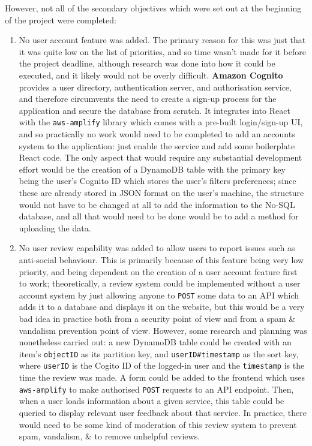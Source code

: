 \documentclass[a4paper,11pt]{report}
\begin{document}
However, not all of the secondary objectives which were set out at the beginning of the project were completed:
\begin{enumerate}
    \item   No user account feature was added.
            The primary reason for this was just that it was quite low on the list of priorities, and so time wasn't made for it before the project deadline, although research was done into how it could be executed, and it likely would not be overly difficult.
            \textbf{Amazon Cognito}\supercite{cognito} provides a user directory, authentication server, and authorisation service, and therefore circumvents the need to create a sign-up process for the application and secure the database from scratch.
            It integrates into React with the \texttt{aws-amplify} library\supercite{amplify} which comes with a pre-built login/sign-up UI, and so practically no work would need to be completed to add an accounts system to the application: just enable the service and add some boilerplate React code.
            The only aspect that would require any substantial development effort would be the creation of a DynamoDB table with the primary key being the user's Cognito ID which stores the user's filters preferences;
            since these are already stored in JSON format on the user's machine, the structure would not have to be changed at all to add the information to the No-SQL database, and all that would need to be done would be to add a method for uploading the data.

    \item   No user review capability was added to allow users to report issues such as anti-social behaviour.
            This is primarily because of this feature being very low priority, and being dependent on the creation of a user account feature first to work;
            theoretically, a review system could be implemented without a user account system by just allowing anyone to \verb|POST| some data to an API which adds it to a database and displays it on the website, but this would be a very bad idea in practice both from a security point of view and from a spam \& vandalism prevention point of view.
            However, some research and planning was nonetheless carried out:
            a new DynamoDB table could be created with an item's \verb|objectID| as its partition key, and \verb|userID#timestamp| as the sort key, where \verb|userID| is the Cogito ID of the logged-in user and the \verb|timestamp| is the time the review was made.
            A form could be added to the frontend which uses \verb|aws-amplify| to make authorised \verb|POST| requests to an API endpoint.
            Then, when a user loads information about a given service, this table could be queried to display relevant user feedback about that service.
            In practice, there would need to be some kind of moderation of this review system to prevent spam, vandalism, \& to remove unhelpful reviews.


\end{enumerate}
\end{document}
